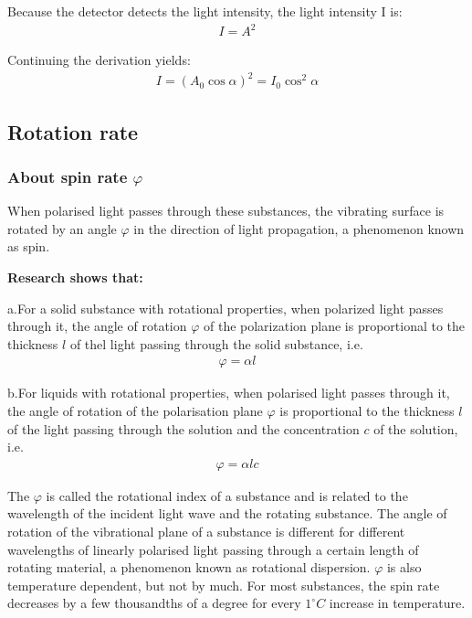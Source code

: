 \documentclass[UTF8]{article}
\begin{document}
	Because the detector detects the light intensity, the light intensity I is:
	\begin{eqnarray}
	I=A^{2} 
	\end{eqnarray}

	 Continuing the derivation yields:
	\begin{eqnarray}
		I=\left (A_{0}\cos {\alpha }   \right ) ^{2} =I_{0} \cos ^{2} \alpha 
	\end{eqnarray}

    \subsection{Rotation rate}
    \subsubsection{About spin rate $\varphi $ }
    When polarised light passes through these substances, the vibrating surface is rotated by an angle $\varphi $ in the direction of light propagation, a phenomenon known as spin.
    
    \textbf{Research shows that:}
    
    a.For a solid substance with rotational properties, when polarized light passes through it, the angle of rotation $\varphi $ of the polarization plane is proportional to the thickness $l$ of thel light passing through the solid substance, i.e.\\
    	\begin{eqnarray}
    	\varphi =\alpha l 
        \end{eqnarray}
    
    b.For liquids with rotational properties, when polarised light passes through it, the angle of rotation of the polarisation plane $\varphi $ is proportional to the thickness $l$ of the light passing through the solution and the concentration $c$ of the solution, i.e.
    \begin{eqnarray}
    \varphi =\alpha lc
    \end{eqnarray}

	The $\varphi $ is called the rotational index of a substance and is related to the wavelength of the incident light wave and the rotating substance. The angle of rotation of the vibrational plane of a substance is different for different wavelengths of linearly polarised light passing through a certain length of rotating material, a phenomenon known as rotational dispersion. $\varphi $ is also temperature dependent, but not by much. For most substances, the spin rate decreases by a few thousandths of a degree for every $1^\circ C$ increase in temperature.
\end{document}
